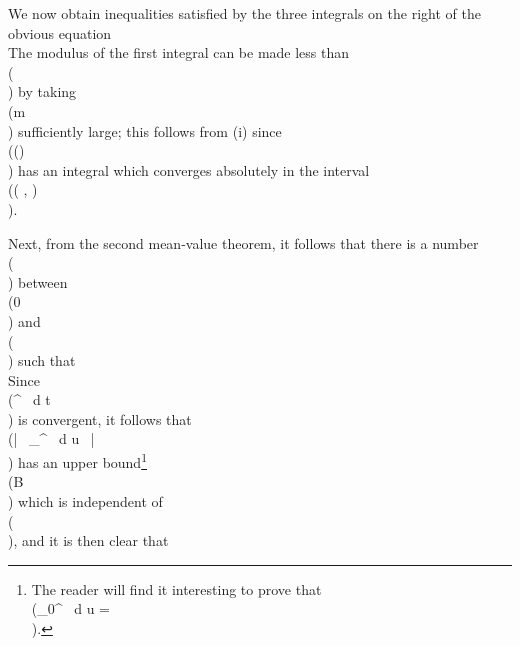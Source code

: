 We now obtain inequalities satisfied by the three integrals on the
right of the obvious equation
\\[ \begin{align*}
  &
 \int_{0}^{\frac{1}{2}\pi}\!
 \frac{\sin (2m+1)\theta}{\sin \theta}
 \phi(\theta) \, d \theta
 =
 \int_{\frac{1}{2} \delta}^{\frac{1}{2} \pi}\!
 \sin (2m+1)\theta
 \frac{\phi(\theta)}{\sin \theta}
 \, d \theta
 \\
 &
 \quad
 \int_{0}^{\frac{1}{2} \delta}\!
 \frac{\sin (2m+1)\theta}{\theta}
 \chi_{1}(\theta) \, d \theta
 -
 \int_{0}^{\frac{1}{2} \delta}\!
 \frac{\sin (2m+1)\theta}{\theta}
 \chi_{2}(\theta) \, d \theta
\end{align*} \\]
%
%

The modulus of the first integral can be made less than \\(\eps\\) by taking \\(m\\)
sufficiently large; this follows from
 (i) %
since \\(\phi(\theta) \cosec \theta\\)
has an integral which converges absolutely in the interval
\\(( \delta,  \pi)\\).

Next, from the second mean-value theorem, it follows that there is a
number \\(\xi\\) between \\(0\\) and \\(\delta\\) such that
\\[ \begin{align*}
TODO
\end{align*} \\]

Since
\\(\int^{\infty}  \, d t\\)
is convergent, it follows that
\\(\left| \, \int_{\beta}^{\infty}  \, d u \, \right| \\)
has an upper bound\footnote{The reader will find it interesting to prove that
  \\(\int_{0}^{\infty}  \, d u = \pi\\).}
\\(B\\) which is independent of \\(\beta\\), and it is then clear that
\\[ 
\left| \, 
  \int_{0}^{\frac{1}{2}\delta}\!
  \frac{\sin (2m+1)\theta}{\theta}
  \chi_{1}(\theta)
  \, d \theta
 \, \right| 
\leq
2 B \chi_{1}(\frac{1}{2}\delta)
<
2 B \eps.
\\] 

